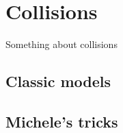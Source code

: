 \chapter{Collisions}\label{ch:collisions}
Something about collisions
\section{Classic models}

\section{Michele's tricks}